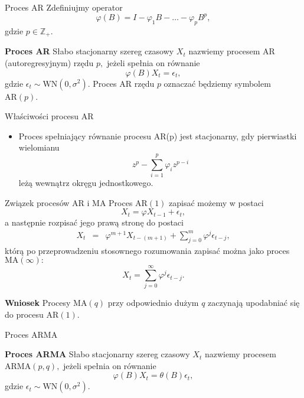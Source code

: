 \documentclass[a4paper, 11pt]{beamer}
\begin{document}
	\begin{frame}{Proces AR}
		Zdefiniujmy operator \[
			\varphi\left(B\right) = I - \varphi_{1} B - \ldots - \varphi_{p} B^{p},
		\] gdzie $p \in \mathbb{Z}_{+}.$
		\begin{block}{\textbf{Proces AR}}
			Słabo stacjonarny szereg czasowy $X_t$ nazwiemy procesem AR (autoregresyjnym) rzędu $p,$ jeżeli spełnia on równanie \[
				\varphi\left(B\right) X_t = \epsilon_{t},
			\] gdzie $\epsilon_{t} \sim \mbox{WN}\left(0, \sigma^2\right).$ Proces AR rzędu $p$ oznaczać będziemy symbolem $\mbox{AR}\left(p\right)$.
		\end{block}
	\end{frame}
	
	\begin{frame}{Właściwości procesu AR}
		\begin{itemize}
			\item Proces spełniający równanie procesu AR(p) jest stacjonarny, gdy pierwiastki wielomianu \[
				z^{p} - \sum_{i=1}^{p} \varphi_{i} z^{p-i}
			\] leżą wewnątrz okręgu jednostkowego.
		\end{itemize}
	\end{frame}
	
	\begin{frame}{Związek procesów AR i MA}
		Proces $\mbox{AR}\left(1\right)$ zapisać możemy w postaci \[
			X_t = \varphi X_{t-1} + \epsilon_{t},
		\] a następnie rozpisać jego prawą stronę do postaci \begin{eqnarray*}
			X_t & = & \varphi^{m+1} X_{t-(m+1)} + \sum_{j=0}^{m} \varphi^{j} \epsilon_{t - j},
		\end{eqnarray*} którą po przeprowadzeniu stosownego rozumowania zapisać można jako proces $\mbox{MA}\left(\infty\right):$ \[
			X_t = \sum_{j = 0}^{\infty} \varphi^{j} \epsilon_{t - j}.
		\]
		\begin{alert}{\textbf{Wniosek}}
			Procesy $\mbox{MA}\left(q\right)$ przy odpowiednio dużym $q$ zaczynają upodabniać się do procesu $\mbox{AR}\left(1\right).$
		\end{alert}
	\end{frame}
	
	\begin{frame}{Proces ARMA}
		\begin{block}{\textbf{Proces ARMA}}
			Słabo stacjonarny szereg czasowy $X_t$ nazwiemy procesem $\mbox{ARMA}\left(p, q\right),$ jeżeli spełnia on równanie \[
				\varphi\left(B\right) X_t = \theta\left(B\right) \epsilon_{t},
			\] gdzie $\epsilon_{t} \sim \mbox{WN}\left(0, \sigma^2\right).$
		\end{block}
	\end{frame}
	
\end{document}
